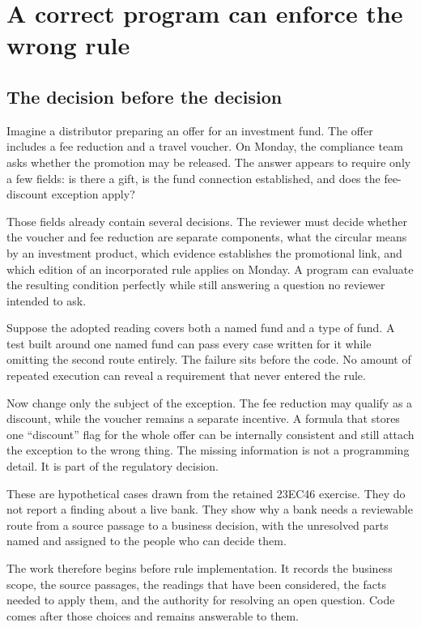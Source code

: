 \chapter{A correct program can enforce the wrong rule}
\label{ch:problem}

\section{The decision before the decision}
\label{merge:M01:00}

\label{sec:problem-decision}
Imagine a distributor preparing an offer for an investment fund. The offer
includes a fee reduction and a travel voucher. On Monday, the compliance team
asks whether the promotion may be released. The answer appears to require only a
few fields: is there a gift, is the fund connection established, and does the
fee-discount exception apply?

Those fields already contain several decisions. The reviewer must decide whether
the voucher and fee reduction are separate components, what the circular means by
an investment product, which evidence establishes the promotional link, and
which edition of an incorporated rule applies on Monday. A program can evaluate
the resulting condition perfectly while still answering a question no reviewer
intended to ask.

Suppose the adopted reading covers both a named fund and a type of fund. A test
built around one named fund can pass every case written for it while omitting the
second route entirely. The failure sits before the code. No amount of repeated
execution can reveal a requirement that never entered the rule.

Now change only the subject of the exception. The fee reduction may qualify as a
discount, while the voucher remains a separate incentive. A formula that stores
one ``discount'' flag for the whole offer can be internally consistent and still
attach the exception to the wrong thing. The missing information is not a
programming detail. It is part of the regulatory decision.

These are hypothetical cases drawn from the retained 23EC46 exercise. They do
not report a finding about a live bank. They show why a bank needs a reviewable
route from a source passage to a business decision, with the unresolved parts
named and assigned to the people who can decide them.

The work therefore begins before rule implementation. It records the business
scope, the source passages, the readings that have been considered, the facts
needed to apply them, and the authority for resolving an open question. Code
comes after those choices and remains answerable to them.

